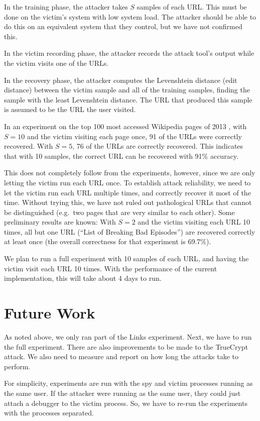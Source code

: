 \documentclass{acm_proc_article-sp}
\begin{document}
In the training phase, the attacker takes $S$ samples of each URL. This must be
done on the victim's system with low system load. The attacker should be able to
do this on an equivalent system that they control, but we have not confirmed
this.

In the victim recording phase, the attacker records the attack tool's output
while the victim visits one of the URLs.

In the recovery phase, the attacker computes the Levenshtein distance (edit
distance) \cite{levenshtein1966binary} between the victim sample and all of the
training samples, finding the sample with the least Levenshtein distance. The
URL that produced this sample is assumed to be the URL the user visited.

In an experiment on the top 100 most accessed Wikipedia pages of 2013
\cite{wikitop2013}, with $S=10$ and the victim visiting each page once, 91 of
the URLs were correctly recovered. With $S=5$, 76 of the URLs are correctly
recovered. This indicates that with 10 samples, the correct URL can be recovered
with 91\% accuracy. 

This does not completely follow from the experiments, however, since we are only
letting the victim run each URL once. To establish attack reliability, we need
to let the victim run each URL multiple times, and correctly recover it most of
the time. Without trying this, we have not ruled out pathological URLs that
cannot be distinguished (e.g.\ two pages that are very similar to each other).
Some preliminary results are known: With $S=2$ and the victim visiting each URL
10 times, all but one URL (``List of Breaking Bad Episodes'') are recovered
correctly at least once (the overall correctness for that experiment is 69.7\%).

We plan to run a full experiment with 10 samples of each URL, and having the
victim visit each URL 10 times. With the performance of the current
implementation, this will take about 4 days to run.

\section{Future Work}
\label{sec:future}

As noted above, we only ran part of the Links experiment. Next, we have to run
the full experiment. There are also improvements to be made to the TrueCrypt
attack. We also need to measure and report on how long the attacks take to
perform.

For simplicity, experiments are run with the spy and victim processes running as
the same user. If the attacker were running as the same user, they could just
attach a debugger to the victim process. So, we have to re-run the experiments
with the processes separated.
\end{document}
